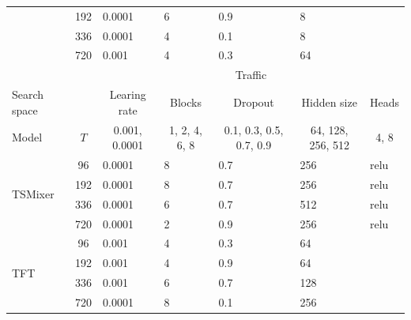 \begin{longtable}{l|c|lllll}
 & 192 & 0.0001 & 6 & 0.9 & 8 &  \\
 & 336 & 0.0001 & 4 & 0.1 & 8 &  \\
 & 720 & 0.001 & 4 & 0.3 & 64 &  \\ \hline
 & \multicolumn{1}{l|}{} & \multicolumn{5}{c}{Traffic} \\ \hline
Search space & \multicolumn{1}{l|}{} & \multicolumn{1}{c}{Learing rate} & \multicolumn{1}{c}{Blocks} & \multicolumn{1}{c}{Dropout} & \multicolumn{1}{c}{Hidden size} & \multicolumn{1}{c}{Heads} \\ \hline
Model & $T$ & \multicolumn{1}{c}{0.001, 0.0001} & \multicolumn{1}{c}{1, 2, 4, 6, 8} & \multicolumn{1}{c}{0.1, 0.3, 0.5, 0.7, 0.9} & \multicolumn{1}{c}{64, 128, 256, 512} & \multicolumn{1}{c}{4, 8} \\ \hline
\multirow{4}{*}{TSMixer} & 96 & 0.0001 & 8 & 0.7 & 256 & relu \\
 & 192 & 0.0001 & 8 & 0.7 & 256 & relu \\
 & 336 & 0.0001 & 6 & 0.7 & 512 & relu \\
 & 720 & 0.0001 & 2 & 0.9 & 256 & relu \\ \hline
\multirow{4}{*}{TFT} & 96 & 0.001 & 4 & 0.3 & 64 &  \\
 & 192 & 0.001 & 4 & 0.9 & 64 &  \\
 & 336 & 0.001 & 6 & 0.7 & 128 &  \\
 & 720 & 0.0001 & 8 & 0.1 & 256 &  \\ \hline
\end{longtable}
